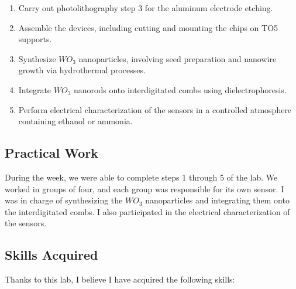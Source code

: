 \begin{enumerate}
    \item Carry out photolithography step 3 for the aluminum electrode etching.
    \item Assemble the devices, including cutting and mounting the chips on TO5 supports.
    \item Synthesize $WO_3$ nanoparticles, involving seed preparation and nanowire growth via hydrothermal processes.
    \item Integrate $WO_3$ nanorods onto interdigitated combs using dielectrophoresis.
    \item Perform electrical characterization of the sensors in a controlled atmosphere containing ethanol or ammonia.
\end{enumerate}

\subsection{Practical Work}

During the week, we were able to complete steps 1 through 5 of the lab. We worked in groups of four, and each group was responsible for its own sensor. I was in charge of synthesizing the $WO_3$ nanoparticles and integrating them onto the interdigitated combs. I also participated in the electrical characterization of the sensors.

\subsection{Skills Acquired}

\indent \indent Thanks to this lab, I believe I have acquired the following skills:


